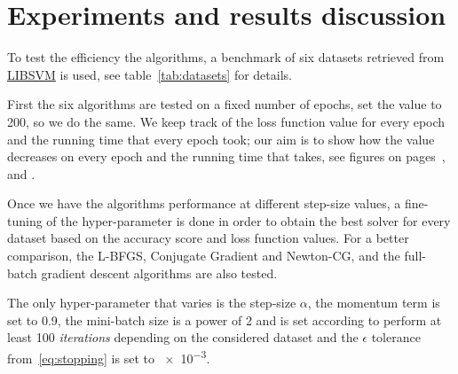 \section{Experiments and results discussion}\label{sc:exp}




To test the efficiency the algorithms, a benchmark of six datasets retrieved from \href{https://www.csie.ntu.edu.tw/~cjlin/libsvmtools/datasets/}{LIBSVM} is used, see table~\vref{tab:datasets} for details.

First the six algorithms are tested on a fixed number of epochs, \textcite{fan_msl_2023} set the value to \num{200}, so we do the same. We keep track of the loss function value for every epoch and the running time that every epoch took; our aim is to show how the value decreases on every epoch and the running time that takes, see figures on pages~\pageref{fig:diab-breast}, \pageref{fig:phish-austr} and \pageref{fig:mush-german}.\par\smallskip

Once we have the algorithms performance at different step-size values, a fine-tuning of the hyper-parameter is done in order to obtain the best solver for every dataset based on the accuracy score and loss function values. For a better comparison, the L-BFGS, Conjugate Gradient and Newton-CG, and the full-batch gradient descent algorithms are also tested.

The only hyper-parameter that varies is the step-size $\alpha$, the momentum term is set to \num{0.9}, the mini-batch size is a power of 2 and is set according to perform at least \num{100} \emph{iterations} depending on the considered dataset and the $\epsilon$ tolerance from~\eqref{eq:stopping} is set to \num{e-3}.

